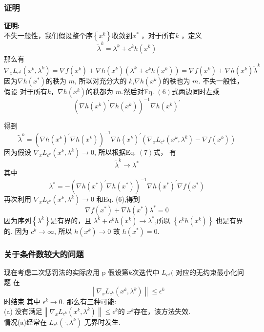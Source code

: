 \documentclass[handout,10pt]{beamer} %
\begin{document}
\begin{frame}
\frametitle{证明}
\textbf{证明:}\\
不失一般性，我们假设整个序$\left\{x^{k}\right\}$收敛到$x^{*}$ ，对于所有$k$ ，定义 
$$
\tilde{\lambda}^{k}=\lambda^{k}+c^{k} h\left(x^{k}\right)
$$
那么有
\begin{equation}
\nabla_{x} L_{c^{k}}\left(x^{k}, \lambda^{k}\right)=\nabla f\left(x^{k}\right)+\nabla h\left(x^{k}\right)\left(\lambda^{k}+c^{k} h\left(x^{k}\right)\right)=\nabla f\left(x^{k}\right)+\nabla h\left(x^{k}\right) \tilde{\lambda}^{k}
\end{equation}
因为$\nabla h\left(x^{*}\right)$的秩为 $m$, 所以对充分大的 $k$,$\nabla h\left(x^{k}\right)$的秩也为 $m$. 不失一般性，假设
对于所有$k $，$\nabla h\left(x^{k}\right)$的秩都为 $m$.然后对Eq. $(6)$式两边同时左乘
$$
\left(\nabla h\left(x^{k}\right)^{\prime} \nabla h\left(x^{k}\right)\right)^{-1} \nabla h\left(x^{k}\right)^{\prime}
$$
\end{frame}

\begin{frame}
得到
\begin{equation}
\tilde{\lambda}^{k}=\left(\nabla h\left(x^{k}\right)^{\prime} \nabla h\left(x^{k}\right)\right)^{-1} \nabla h\left(x^{k}\right)^{\prime}\left(\nabla_{x} L_{c^{k}}\left(x^{k}, \lambda^{k}\right)-\nabla f\left(x^{k}\right)\right)
\end{equation}
因为假设 $\nabla_{x} L_{c^{k}}\left(x^{k}, \lambda^{k}\right) \rightarrow 0$, 所以根据Eq. $(7)$式， 有
$$
\tilde{\lambda}^{k} \rightarrow \lambda^{*}
$$
其中
$$
\lambda^{*}=-\left(\nabla h\left(x^{*}\right)^{\prime} \nabla h\left(x^{*}\right)\right)^{-1} \nabla h\left(x^{*}\right)^{\prime} \nabla f\left(x^{*}\right)
$$
再次利用 $\nabla_{x} L_{c^{k}}\left(x^{k}, \lambda^{k}\right) \rightarrow 0$ 和Eq. (6),得到
$$
\nabla f\left(x^{*}\right)+\nabla h\left(x^{*}\right) \lambda^{*}=0
$$
因为序列$\left\{\lambda^{k}\right\}$是有界的，且 $\lambda^{k}+c^{k} h\left(x^{k}\right) \rightarrow \lambda^{*}$,所以 $\left\{c^{k} h\left(x^{k}\right)\right\}$
也是有界的. 因为 $c^{k} \rightarrow \infty$, 所以 $h\left(x^{k}\right) \rightarrow 0$ 故 $h\left(x^{*}\right)=0 .$ 
\end{frame}

\begin{frame}
\frametitle{关于条件数较大的问题}

现在考虑二次惩罚法的实际应用 $\mathrm{p}$ 假设第$k$次迭代中 $L_{c^{k}}($ 对应的无约束最小化问题
在
$$
\left\|\nabla_{x} L_{c^{k}}\left(x^{k}, \lambda^{k}\right)\right\| \leq \epsilon^{k}
$$
时结束
其中 $\epsilon^{k} \rightarrow 0$. 那么有三种可能:\\
\qquad (a) 没有满足$
\left\|\nabla_{x} L_{c^{k}}\left(x^{k}, \lambda^{k}\right)\right\| \leq \epsilon^{k}
$的 $x^{k}$存在，该方法失效.\\
\qquad 情况(a)经常在  $L_{c^{k}}\left(\cdot, \lambda^{k}\right)$ 无界时发生.\\
\end{frame}
\end{document}
